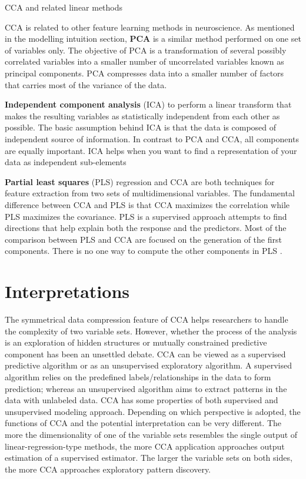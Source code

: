\begin{infobox}{CCA and related linear methods}

CCA is related to other feature learning methods in neuroscience. As mentioned in the modelling intuition section, \textbf{PCA} is a similar method performed on one set of variables only. The objective of PCA is a transformation of several possibly correlated variables into a smaller number of uncorrelated variables known as principal components. PCA compresses data into a smaller number of factors that carries most of the variance of the data.

\textbf{Independent component analysis} (ICA) to perform a linear transform that makes the resulting variables as statistically independent from each other as possible. The basic assumption behind ICA is that the data is composed of independent source of information. In contrast to PCA and CCA, all components are equally important. ICA helps when you want to find a representation of your data as independent sub-elements

\textbf{Partial least squares} (PLS) regression and CCA are both techniques for feature extraction from two sets of multidimensional variables. The fundamental difference between CCA and PLS is that CCA maximizes the correlation while PLS maximizes the covariance. PLS is a supervised approach attempts to find directions that help explain both the response and the predictors. Most of the comparison between PLS and CCA are focused on the generation of the first components. There is no one way to compute the other components in PLS \cite{DeBie2005}.
\end{infobox}

\section{Interpretations}
\label{ch:methods:interpretations}
The symmetrical data compression feature of CCA helps researchers to handle the complexity of two variable sets. However, whether the process of the analysis is an exploration of hidden structures or mutually constrained predictive component has been an unsettled debate. CCA can be viewed as a supervised predictive algorithm or as an unsupervised exploratory algorithm. A supervised algorithm relies on the predefined labels/relationships in the data to form prediction; whereas an unsupervised algorithm aims to extract patterns in the data with unlabeled data. CCA has some properties of both supervised and unsupervised modeling approach. Depending on which perspective is adopted, the functions of CCA and the potential interpretation can be very different.  The more the dimensionality of one of the variable sets resembles the single output of linear-regression-type methods, the more CCA application approaches output estimation of a supervised estimator. The larger the variable sets on both sides, the more CCA approaches exploratory pattern discovery.

